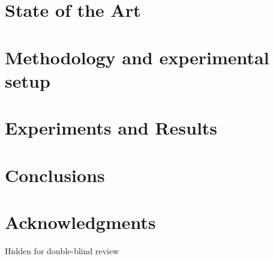 \documentclass[runningheads,a4paper]{llncs}
\begin{document}
%
\section{State of the Art}
\label{sec:SoA}



%
%
\section{Methodology and experimental setup}
\label{sec:met}

%
\section{Experiments and Results}
\label{sec:res}


%
\section{Conclusions}

\section*{Acknowledgments}

Hidden for double-blind review




\end{document}
